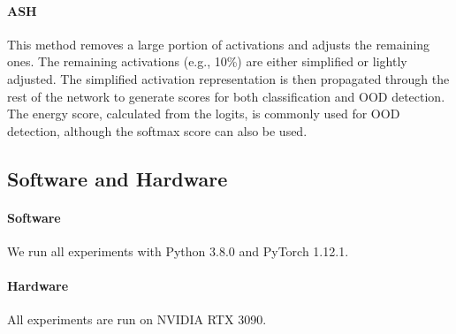 \documentclass{article}
\begin{document}
\paragraph{ASH \cite{djurisic2022extremely}} This method removes a large portion of activations and adjusts the remaining ones. The remaining activations (e.g., 10\%) are either simplified or lightly adjusted. The simplified activation representation is then propagated through the rest of the network to generate scores for both classification and OOD detection. The energy score, calculated from the logits, is commonly used for OOD detection, although the softmax score can also be used. 


\subsection{Software and Hardware}
\paragraph{Software} We run all experiments with Python 3.8.0 and PyTorch 1.12.1.
\paragraph{Hardware} All experiments are run on NVIDIA RTX 3090.
\end{document}

